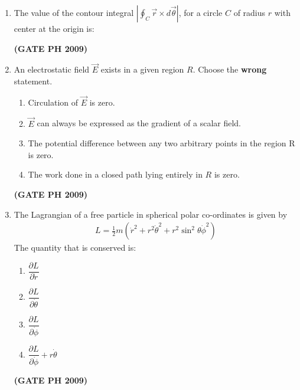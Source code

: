 \documentclass[14pt, a4paper]{extarticle}
\begin{document}
\begin{enumerate}[label=\textbf{Q. \arabic*}]

\item The value of the contour integral
    $ \left| \oint_C \vec{r} \times d\vec{\theta} \right| $,
    for a circle $C$ of radius $r$ with center at the origin is:
    \begin{enumerate}
    \end{enumerate}
    \hfill \textbf{(GATE PH 2009)}

\item An electrostatic field $\vec{E}$ exists in a given region $R$. Choose the \textbf{wrong} statement.
   
    \begin{enumerate}
        \item Circulation of $\vec{E}$ is zero.
        \item $\vec{E}$ can always be expressed as the gradient of a scalar field.
        \item The potential difference between any two arbitrary points in the region R is zero.
        \item The work done in a closed path lying entirely in $R$ is zero.   
    \end{enumerate}
    \hfill \textbf{(GATE PH 2009)}


\item The Lagrangian of a free particle in spherical polar co-ordinates is given by
    \begin{align*}
    L = \frac{1}{2}m(\dot{r}^2 + r^2\dot{\theta}^2 + r^2\sin^2\theta\dot{\phi}^2)
    \end{align*}
    The quantity that is conserved is:
    \begin{multicols}{2}
    \begin{enumerate}
        \item $\dfrac{\partial L}{\partial \dot{r}}$
        \item $\dfrac{\partial L}{\partial \dot{\theta}}$
        \item $\dfrac{\partial L}{\partial \dot{\phi}}$
        \item $\dfrac{\partial L}{\partial \dot{\phi}} + r \dot{\theta}$
    \end{enumerate}
    \end{multicols}
    \hfill \textbf{(GATE PH 2009)}


\end{enumerate}
\end{document}
